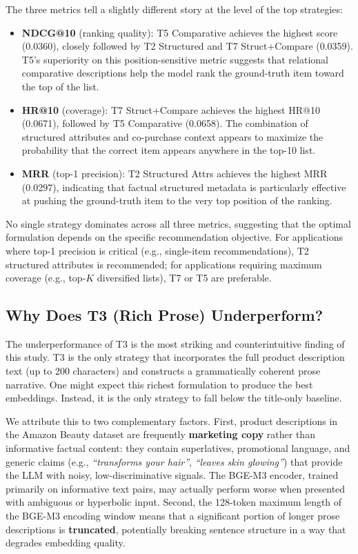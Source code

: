 \documentclass[12pt,a4paper]{report}
\begin{document}
The three metrics tell a slightly different story at the
level of the top strategies:

\begin{itemize}
  \item \textbf{NDCG@10} (ranking quality): T5 Comparative
        achieves the highest score (0.0360), closely followed
        by T2 Structured and T7 Struct+Compare (0.0359).
        T5's superiority on this position-sensitive metric
        suggests that relational comparative descriptions
        help the model rank the ground-truth item toward
        the top of the list.
  \item \textbf{HR@10} (coverage): T7 Struct+Compare
        achieves the highest HR@10 (0.0671), followed by
        T5 Comparative (0.0658). The combination of
        structured attributes and co-purchase context
        appears to maximize the probability that the correct
        item appears anywhere in the top-10 list.
  \item \textbf{MRR} (top-1 precision): T2 Structured Attrs
        achieves the highest MRR (0.0297), indicating that
        factual structured metadata is particularly effective
        at pushing the ground-truth item to the very top
        position of the ranking.
\end{itemize}

No single strategy dominates across all three metrics,
suggesting that the optimal formulation depends on the
specific recommendation objective. For applications where
top-1 precision is critical (e.g., single-item recommendations),
T2 structured attributes is recommended; for applications
requiring maximum coverage (e.g., top-$K$ diversified lists),
T7 or T5 are preferable.

\subsection{Why Does T3 (Rich Prose) Underperform?}

The underperformance of T3 is the most striking and
counterintuitive finding of this study. T3 is the only
strategy that incorporates the full product description
text (up to 200 characters) and constructs a grammatically
coherent prose narrative. One might expect this richest
formulation to produce the best embeddings. Instead, it
is the only strategy to fall below the title-only baseline.

We attribute this to two complementary factors. First,
product descriptions in the Amazon Beauty dataset are
frequently \textbf{marketing copy} rather than informative
factual content: they contain superlatives, promotional
language, and generic claims (e.g., \textit{``transforms
your hair''}, \textit{``leaves skin glowing''}) that
provide the LLM with noisy, low-discriminative signals.
The BGE-M3 encoder, trained primarily on informative text
pairs, may actually perform worse when presented with
ambiguous or hyperbolic input. Second, the 128-token
maximum length of the BGE-M3 encoding window means that
a significant portion of longer prose descriptions
is \textbf{truncated}, potentially breaking sentence
structure in a way that degrades embedding quality.
\end{document}
